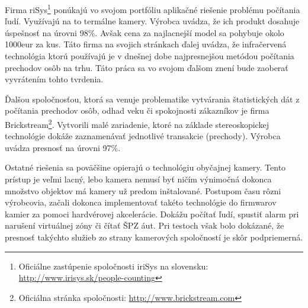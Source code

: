 \vspace{8mm}
 
Firma riSys\footnote{Oficiálne zastúpenie spoločnosti iriSys na slovensku: \url{http://www.irisys.sk/people-counting}} ponúkajú vo svojom portfóliu aplikačné riešenie problému počítania ľudí. Využívajú na to termálne kamery. Výrobca uvádza, že ich produkt dosahuje úspešnosť na úrovni 98\%. Avšak cena za najlacnejší model sa pohybuje okolo 1000eur za kus. Táto firma na svojich stránkach ďalej uvádza, že infračervená technológia ktorú používajú je v dnešnej dobe najpresnejšou metódou počítania prechodov osôb na trhu. Táto práca sa vo svojom ďalšom znení bude zaoberať vyvrátením tohto tvrdenia. 

Ďalšou spoločnosťou, ktorá sa venuje problematike vytvárania štatistických dát z počítania prechodov osôb, odhad veku či spokojnosti zákazníkov je firma Brickstream\footnote{Oficiálna stránka spoločnosti: \url{http://www.brickstream.com}}. Vytvorili malé zariadenie, ktoré na základe stereoskopickej technológie dokáže zaznamenávať jednotlivé transakcie (prechody). Výrobca uvádza presnosť na úrovni 97\%.


Ostatné riešenia sa poväčšine opierajú o technológiu obyčajnej kamery. Tento prístup je veľmi lacný, lebo kamera nemusí byť ničím výnimočná dokonca množstvo objektov má kamery už  predom inštalované. Postupom času rôzni výrobcovia, začali dokonca implementovať takéto technológie do firmwarov kamier za pomoci hardvérovej akcelerácie. Dokážu počítať ľudí, spustiť alarm pri narušení virtuálnej zóny či čítať ŠPZ áut. Pri testoch však bolo dokázané, že presnosť takýchto služieb zo strany kamerových spoločností je skôr podpriemerná. 





